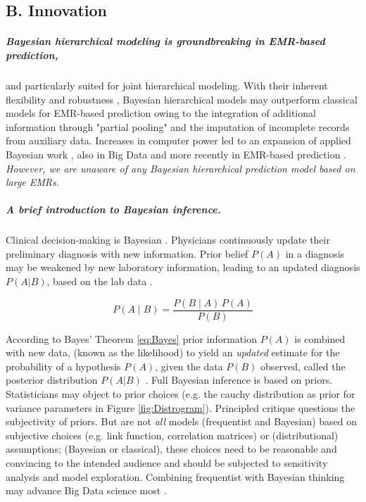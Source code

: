 \documentclass[11pt,notitlepage]{article}
\begin{document}
\subsection*{B. Innovation}

\subparagraph*{Bayesian hierarchical modeling is groundbreaking in EMR-based prediction,} and particularly suited for joint hierarchical modeling. With their inherent flexibility and robustness \cite{Carlin_1349763,Sutton_2012}, Bayesian hierarchical models may outperform classical models for EMR-based prediction owing to the integration of additional information through "partial pooling" \cite{Gelman_red_2009} and the imputation of incomplete records from auxiliary data. Increases in computer power led to an expansion of applied Bayesian work \cite{Ashby_16947924,Spiegelhalter_11134920}, also in Big Data \cite{Efron_largescale_2013,Yoo_24987556} and more recently in EMR-based prediction \cite{Himes_19261943,Ryynaenen_23496851,Wu_20473190}. \textit{However, we are unaware of any Bayesian hierarchical prediction model based on large EMRs.} 

\subparagraph{A brief introduction to Bayesian inference.} Clinical decision-making is Bayesian \cite{Spiegelhalter_11134920}. Physicians continuously update their preliminary diagnosis with new information. Prior belief $P(A)$ in a diagnosis may be weakened by new laboratory information, leading to an updated diagnosis $P(A|B)$, based on the lab data \cite{Kruschke_22774788, Kruschke_Book_2014}. 
  
\begin{figure}
\vspace{-10pt}
  \begin{equation}
   \label{eq:Bayes}
P(A \mid B) = \frac{P(B \mid A) \, P(A)}{P(B)}
   \end{equation}
   \vspace{-20pt}
\end{figure}

According to Bayes' Theorem \ref{eq:Bayes} prior information $P(A)$ is combined with new data, (known as the likelihood) to yield an \textit{updated} estimate for the probability of a hypothesis $P(A)$, given the data $P(B)$ observed, called the posterior distribution $P(A|B)$ \cite{Thomas_Bayes}. Full Bayesian inference is based on priors. Statisticians may object to prior choices (e.g. the cauchy distribution as prior for variance parameters \cite{Gelman_Cauchy_2006} in Figure \ref{fig:Distrogram}).  Principled critique questions the subjectivity of priors. But are not \textit{all} models (frequentist and Bayesian) based on subjective choices \cite{Wagenmakers_Bayesian_v_Freq_2008} (e.g. link function, correlation matrices) or (distributional) assumptions; (Bayesian or classical), these choices need to be reasonable and convincing to the intended audience and should be subjected to sensitivity analysis and model exploration. Combining frequentist with Bayesian thinking may advance Big Data science most \cite{Efron_Bayes_v_Freqentisit,Efron_largescale_2013}. 
\end{document}
